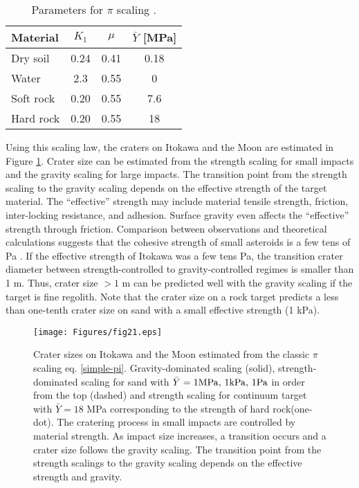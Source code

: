 \documentclass[3p,authoryear]{elsarticle}
\begin{document}
\begin{table}[htbp]
	\centering
	\caption{Parameters for $\pi$ scaling \citep{holsapple1993}.}
	\label{pi-params}
	\small
	\begin{tabular}{lccc}\hline
	Material & $K_1$ & $\mu$ & $\bar{Y}$ [MPa]\\ \hline
	Dry soil & 0.24 & 0.41 & 0.18 \\
	Water & 2.3 & 0.55 & 0 \\
	Soft rock & 0.20 & 0.55 & 7.6\\
	Hard rock & 0.20 & 0.55 & 18\\ \hline
	\end{tabular}
	\centering
\end{table}

Using this scaling law, the craters on Itokawa and the Moon are estimated in Figure \ref{impactor-crater}.
Crater size can be estimated from the strength scaling for small impacts and the gravity scaling for large impacts.
The transition point from the strength scaling to the gravity scaling depends on the effective strength of the target material.
The ``effective'' strength may include material tensile strength, friction, inter-locking resistance, and adhesion. Surface gravity even affects the ``effective'' strength through friction.
Comparison between observations and theoretical calculations suggests that the cohesive strength of small asteroids is a few tens of Pa \citep{sanchez2014, rozitis2014}.
If the effective strength of Itokawa was a few tens Pa, the transition crater diameter between strength-controlled to gravity-controlled regimes is smaller than 1 m.
Thus, crater size $> 1$ m can be predicted well with the gravity scaling if the target is fine regolith.
Note that the crater size on a rock target predicts a less than one-tenth crater size on sand with a small effective strength (1 kPa).
\begin{figure}[htbp]
	\centering
	\texttt{[image: Figures/fig21.eps]}
	\caption{Crater sizes on Itokawa and the Moon estimated from the classic $\pi$ scaling eq. \eqref{simple-pi}. Gravity-dominated scaling (solid), strength-dominated scaling for sand with $\bar{Y}=1 {\rm MPa},\, 1{\rm kPa},\, 1{\rm Pa}$ in order from the top (dashed) and strength scaling for continuum target with $\bar{Y}=18$ MPa corresponding to the strength of hard rock(one-dot). The cratering process in small impacts are controlled by material strength. As impact size increases, a transition occurs and a crater size follows the gravity scaling. The transition point from the strength scalings to the gravity scaling depends on the effective strength and gravity.}
	\label{impactor-crater}
	\centering
\end{figure}
\end{document}
